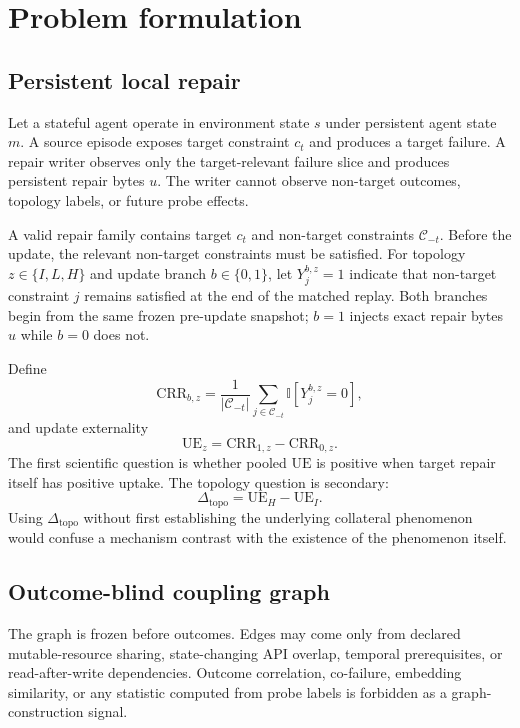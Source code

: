 \documentclass{article}
\begin{document}
\section{Problem formulation}
\label{sec:problem}
\subsection{Persistent local repair}
Let a stateful agent operate in environment state $s$ under persistent agent state $m$. A source episode exposes target constraint $c_t$ and produces a target failure. A repair writer observes only the target-relevant failure slice and produces persistent repair bytes $u$. The writer cannot observe non-target outcomes, topology labels, or future probe effects.

A valid repair family contains target $c_t$ and non-target constraints $\mathcal{C}_{-t}$. Before the update, the relevant non-target constraints must be satisfied. For topology $z\in\{I,L,H\}$ and update branch $b\in\{0,1\}$, let $Y_j^{b,z}=1$ indicate that non-target constraint $j$ remains satisfied at the end of the matched replay. Both branches begin from the same frozen pre-update snapshot; $b=1$ injects exact repair bytes $u$ while $b=0$ does not.

Define
\begin{equation}
\mathrm{CRR}_{b,z}=\frac{1}{|\mathcal{C}_{-t}|}\sum_{j\in\mathcal{C}_{-t}}\mathbb{I}[Y_j^{b,z}=0],
\end{equation}
and update externality
\begin{equation}
\mathrm{UE}_z=\mathrm{CRR}_{1,z}-\mathrm{CRR}_{0,z}.
\end{equation}
The first scientific question is whether pooled $\mathrm{UE}$ is positive when target repair itself has positive uptake. The topology question is secondary:
\begin{equation}
\Delta_{\mathrm{topo}}=\mathrm{UE}_H-\mathrm{UE}_I.
\end{equation}
Using $\Delta_{\mathrm{topo}}$ without first establishing the underlying collateral phenomenon would confuse a mechanism contrast with the existence of the phenomenon itself.

\subsection{Outcome-blind coupling graph}
The graph is frozen before outcomes. Edges may come only from declared mutable-resource sharing, state-changing API overlap, temporal prerequisites, or read-after-write dependencies. Outcome correlation, co-failure, embedding similarity, or any statistic computed from probe labels is forbidden as a graph-construction signal.
\end{document}

